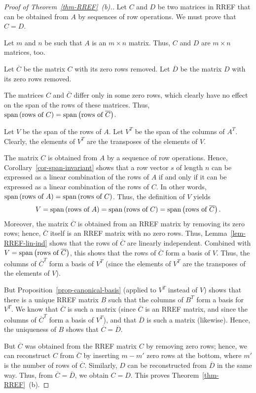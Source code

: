 \documentclass[reqno]{amsart}
\theoremstyle{definition}
\begin{document}
\begin{proof}[Proof of Theorem~\ref{thm-RREF}~(b).]
Let $C$ and $D$ be two matrices in RREF that can be obtained
from $A$ by sequences of row operations.
We must prove that $C = D$.

Let $m$ and $n$ be such that $A$ is an $m \times n$ matrix.
Thus, $C$ and $D$ are $m \times n$ matrices, too.

Let $\overline{C}$ be the matrix $C$ with its zero rows
removed.
Let $\overline{D}$ be the matrix $D$ with its zero rows
removed.

The matrices $C$ and $\overline{C}$ differ only in some
zero rows, which clearly have no effect on the span of
the rows of these matrices.
Thus, $\operatorname{span}\left(\text{rows of $C$}\right)
= \operatorname{span}\left(\text{rows of $\overline{C}$}\right)$.

Let $V$ be the span of the rows of $A$.
Let $V^T$ be the span of the columns of $A^T$.
Clearly, the elements of $V^T$ are the transposes of
the elements of $V$.

The matrix $C$ is obtained from $A$ by a sequence of
row operations.
Hence, Corollary~\ref{cor-span-invariant} shows that
a row vector $s$ of length $n$ can be expressed as a
linear combination of the rows of $A$ if and only if
it can be expressed as a linear combination of
the rows of $C$.
In other words, $\operatorname{span}\left(\text{rows of $A$}\right)
= \operatorname{span}\left(\text{rows of $C$}\right)$.
Thus, the definition of $V$ yields
\[
V = \operatorname{span}\left(\text{rows of $A$}\right)
= \operatorname{span}\left(\text{rows of $C$}\right)
= \operatorname{span}\left(\text{rows of $\overline{C}$}\right) .
\]
Moreover, the matrix $\overline{C}$ is obtained from an
RREF matrix by removing its zero rows; hence,
$\overline{C}$ itself is an RREF matrix with no zero rows.
Thus, Lemma~\ref{lem-RREF-lin-ind} shows that the rows
of $\overline{C}$ are linearly independent.
Combined with $V = \operatorname{span}\left(\text{rows of $\overline{C}$}\right)$,
this shows that the rows of $\overline{C}$ form a basis
of $V$.
Thus, the columns of $\overline{C}^T$ form a basis of
$V^T$ (since the elements of $V^T$ are the transposes of
the elements of $V$).

But Proposition~\ref{prop-canonical-basis} (applied
to $V^T$ instead of $V$) shows that
there is a unique RREF matrix $B$ such that the columns of
$B^T$ form a basis for $V^T$.
We know that $\overline{C}$ is such a matrix (since
$\overline{C}$ is an RREF matrix, and since
the columns of $\overline{C}^T$ form a basis of
$V^T$), and that $\overline{D}$ is such a matrix (likewise).
Hence, the uniqueness of $B$ shows that
$\overline{C} = \overline{D}$.

But $\overline{C}$ was obtained from the RREF matrix
$C$ by removing zero rows; hence, we can reconstruct $C$ from
$\overline{C}$ by inserting $m-m'$ zero rows at the bottom,
where $m'$ is the number of rows of $\overline{C}$.
Similarly, $D$ can be reconstructed from $\overline{D}$ in
the same way.
Thus, from $\overline{C} = \overline{D}$, we obtain $C = D$.
This proves Theorem~\ref{thm-RREF}~(b).
\end{proof}


 
\end{document}
